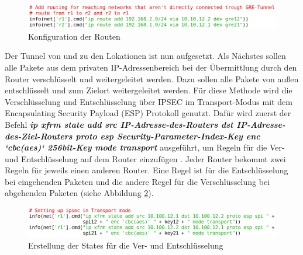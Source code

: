 \documentclass[fontsize=12pt,paper=a4,open=any,parskip=half,
  twoside=false,toc=listof,toc=bibliography,fleqn,leqno,
  captions=nooneline,captions=tableabove,british]{scrbook}
\begin{document}
\begin{figure}[H]
 \centering
 \includegraphics[width=1.0\textwidth]{Bilder/route}
 \captionsetup{justification=centering,margin=2cm}
 \caption{Konfiguration der Routen}
 \label{route}
\end{figure}


Der Tunnel von und zu den Lokationen ist nun aufgesetzt. Als Nächstes sollen alle Pakete aus dem privaten IP-Adressenbereich bei der Übermittlung durch den Router verschlüsselt und weitergeleitet werden. Dazu sollen alle Pakete von außen entschlüsselt und zum Zielort weitergeleitet werden. Für diese Methode wird die Verschlüsselung und Entschlüsselung über IPSEC im Transport-Modus mit dem Encapsulating Security Payload (ESP) Protokoll genutzt. Dafür wird zuerst der Befehl \textit{\textbf{ip xfrm state add src IP-Adresse-des-Routers dst IP-Adresse-des-Ziel-Routers proto esp Security-Parameter-Index-Key enc ‘cbc(aes)‘ 256bit-Key mode transport}} ausgeführt, um Regeln für die Ver- und Entschlüsselung auf dem Router einzufügen \cite{esp}. Jeder Router bekommt zwei Regeln für jeweils einen anderen Router. Eine Regel ist für die Entschlüsselung bei eingehenden Paketen und die andere Regel für die Verschlüsselung bei abgehenden Paketen (siehe Abbildung \ref{state}).

\begin{figure}[H]
 \centering
 \includegraphics[width=1.0\textwidth]{Bilder/state}
 \captionsetup{justification=centering,margin=2cm}
 \caption{Erstellung der States für die Ver- und Entschlüsselung}
 \label{state}
\end{figure}
\end{document}
